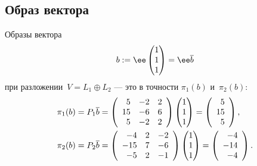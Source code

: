 \begin{solution}
	\subsection{Образ вектора}
		Образы вектора
		\[
			b := \ee \Vect{1 \\ 1 \\ 1} = \ee \crd{b}
		\]
		при разложении~$V = L_1 \oplus L_2$ --- это в точности $\pi_1(b)$ и~$\pi_2(b)$:
		\begin{align*}
			\pi_1(b) &= P_1 \overline{b}
			=
			\left(
				\begin{array}{rrr}
					5 & -2 & 2
					\\
					15 & -6 & 6
					\\
					5 & -2 & 2
				\end{array}
			\right)
			\begin{pmatrix}1 \\ 1 \\ 1\end{pmatrix}
			=
			\left(
				\begin{array}{r}
					5
					\\
					15
					\\
					5
				\end{array}
			\right)
			,
			\\
			\pi_2(b) &= P_2 \overline{b}
			=
			\left(
				\begin{array}{rrr}
					-4 & 2 & -2
					\\
					-15 & 7 & -6
					\\
					-5 & 2 & -1
				\end{array}
			\right)
			\begin{pmatrix}1 \\ 1 \\ 1\end{pmatrix}
			=
			\left(
				\begin{array}{r}
					-4
					\\
					-14
					\\
					-4
				\end{array}
			\right)
			.
		\end{align*}
\end{solution}
